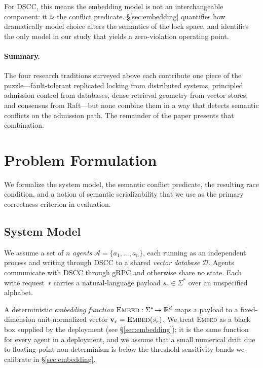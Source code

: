 \documentclass[sigconf]{acmart}
\begin{document}
For DSCC, this means the embedding model is not an interchangeable
component: it \emph{is} the conflict predicate. \S\ref{sec:embedding}
quantifies how dramatically model choice alters the semantics of the lock
space, and identifies the only model in our study that yields a
zero-violation operating point.

\paragraph{\textbf{Summary.}} The four research traditions surveyed above each
contribute one piece of the puzzle---fault-tolerant replicated locking from
distributed systems, principled admission control from databases, dense
retrieval geometry from vector stores, and consensus from
Raft---but none combine them in a way that detects semantic conflicts on
the admission path. The remainder of the paper presents that combination.


\section{Problem Formulation}
\label{sec:problem}

We formalize the system model, the semantic conflict predicate, the
resulting race condition, and a notion of semantic serializability that we
use as the primary correctness criterion in evaluation.

\subsection{System Model}
\label{sec:model}

We assume a set of $n$ \emph{agents} $\mathcal{A}=\{a_1,\dots,a_n\}$, each
running as an independent process and writing through DSCC to a shared
\emph{vector database} $\mathcal{D}$. Agents communicate with DSCC through
gRPC and otherwise share no state. Each write request~$r$ carries a
natural-language payload $s_r\in\Sigma^*$ over an unspecified alphabet.

A deterministic \emph{embedding function}
$\textsc{Embed}:\Sigma^*\!\to\mathbb{R}^d$ maps a payload to a fixed-dimension
unit-normalized vector $\mathbf{v}_r=\textsc{Embed}(s_r)$. We treat
\textsc{Embed} as a black box supplied by the deployment (see
\S\ref{sec:embedding}); it is the same function for every agent in a
deployment, and we assume that a small numerical drift due to
floating-point non-determinism is below the threshold sensitivity bands we
calibrate in \S\ref{sec:embedding}.
\end{document}

